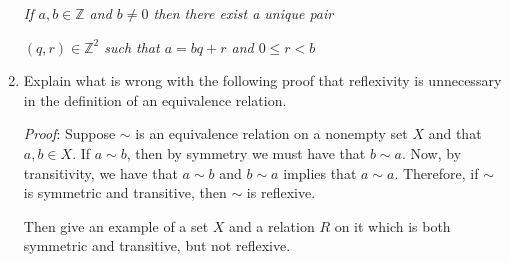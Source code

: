 \documentclass{article}
\begin{document}
\begin{enumerate}
    \begin{center}
        \textit{If $a,b \in \mathbb{Z}$ and $b \neq 0$ then there exist a unique pair}
        
        \textit{$( q,r) \in \mathbb{Z}^2$ such that $a = bq + r$ and $0 \leq r < b$}
    \end{center}

    \item  Explain what is wrong with the following proof that reflexivity is unnecessary in the definition
    of an equivalence relation.
    \begin{addmargin}[2em]{3em}
    \textit{Proof}: Suppose $\sim$ is an equivalence relation on a nonempty set $X$ and that $a, b \in X$.
    If $a \sim b$, then by symmetry we must have that $b \sim a$. Now, by transitivity, we have
    that $a \sim b$ and $b \sim a$ implies that $a \sim a$. Therefore, if $\sim$ is symmetric and transitive,
    then $\sim$ is reflexive.
    \end{addmargin}
    Then give an example of a set $X$ and a relation $R$ on it which is both symmetric and transitive, but not reflexive.


\end{enumerate}
\end{document}
